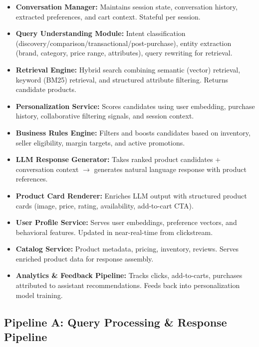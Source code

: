 \begin{itemize}
  \item \textbf{Conversation Manager:} Maintains session state, conversation history, extracted preferences, and cart context. Stateful per session.
  \item \textbf{Query Understanding Module:} Intent classification (discovery/comparison/transactional/post-purchase), entity extraction (brand, category, price range, attributes), query rewriting for retrieval.
  \item \textbf{Retrieval Engine:} Hybrid search combining semantic (vector) retrieval, keyword (BM25) retrieval, and structured attribute filtering. Returns candidate products.
  \item \textbf{Personalization Service:} Scores candidates using user embedding, purchase history, collaborative filtering signals, and session context.
  \item \textbf{Business Rules Engine:} Filters and boosts candidates based on inventory, seller eligibility, margin targets, and active promotions.
  \item \textbf{LLM Response Generator:} Takes ranked product candidates + conversation context $\rightarrow$ generates natural language response with product references.
  \item \textbf{Product Card Renderer:} Enriches LLM output with structured product cards (image, price, rating, availability, add-to-cart CTA).
  \item \textbf{User Profile Service:} Serves user embeddings, preference vectors, and behavioral features. Updated in near-real-time from clickstream.
  \item \textbf{Catalog Service:} Product metadata, pricing, inventory, reviews. Serves enriched product data for response assembly.
  \item \textbf{Analytics \& Feedback Pipeline:} Tracks clicks, add-to-carts, purchases attributed to assistant recommendations. Feeds back into personalization model training.
\end{itemize}

\subsection*{Pipeline A: Query Processing \& Response Pipeline}

